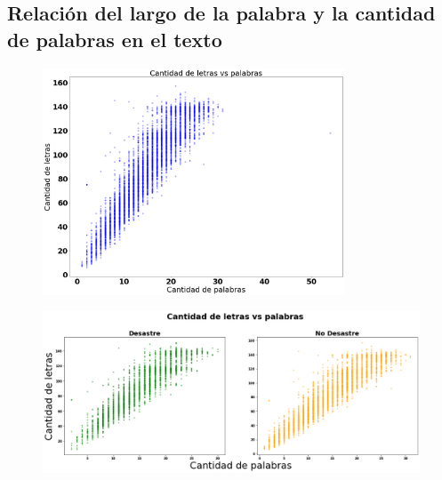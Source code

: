 \documentclass[titlepage,a4paper]{article}
\begin{document}
\subsection{\Large Relación del largo de la palabra y la cantidad de palabras en el texto}
{\Large
\begin{figure}[H]
 \centering
 \includegraphics[width=0.8\textwidth, height=0.8\textheight, keepaspectratio]{graficos/cantidad_letras_palabras_0.png}
\end{figure}
\begin{figure}[H]
 \centering
 \includegraphics[width=1.1\textwidth, height=2\textheight, keepaspectratio]{graficos/cantidad_letras_palabras_1.png}
\end{figure}
\par}
\end{document}
